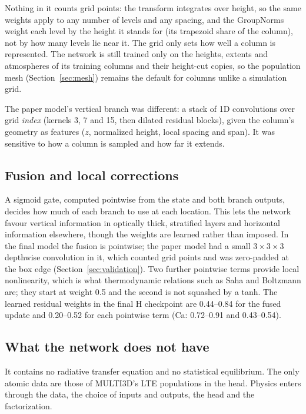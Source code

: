 Nothing in it counts grid points: the transform integrates over height, so the same weights apply to any number of levels and any spacing, and the GroupNorms weight each level by the height it stands for (its trapezoid share of the column), not by how many levels lie near it. The grid only sets how well a column is represented. The network is still trained only on the heights, extents and atmospheres of its training columns and their height-cut copies, so the population mesh (Section~\ref{sec:mesh}) remains the default for columns unlike a simulation grid.

The paper model's vertical branch was different: a stack of 1D convolutions over grid \emph{index} (kernels 3, 7 and 15, then dilated residual blocks), given the column's geometry as features ($z$, normalized height, local spacing and span). It was sensitive to how a column is sampled and how far it extends.

\subsection{Fusion and local corrections}
A sigmoid gate, computed pointwise from the state and both branch outputs, decides how much of each branch to use at each location. This lets the network favour vertical information in optically thick, stratified layers and horizontal information elsewhere, though the weights are learned rather than imposed. In the final model the fusion is pointwise; the paper model had a small $3\times3\times3$ depthwise convolution in it, which counted grid points and was zero-padded at the box edge (Section~\ref{sec:validation}). Two further pointwise terms provide local nonlinearity, which is what thermodynamic relations such as Saha and Boltzmann are; they start at weight 0.5 and the second is not squashed by a tanh. The learned residual weights in the final H checkpoint are 0.44--0.84 for the fused update and 0.20--0.52 for each pointwise term (Ca: 0.72--0.91 and 0.43--0.54).

\subsection{What the network does not have}
It contains no radiative transfer equation and no statistical equilibrium. The only atomic data are those of MULTI3D's LTE populations in the head. Physics enters through the data, the choice of inputs and outputs, the head and the factorization.


